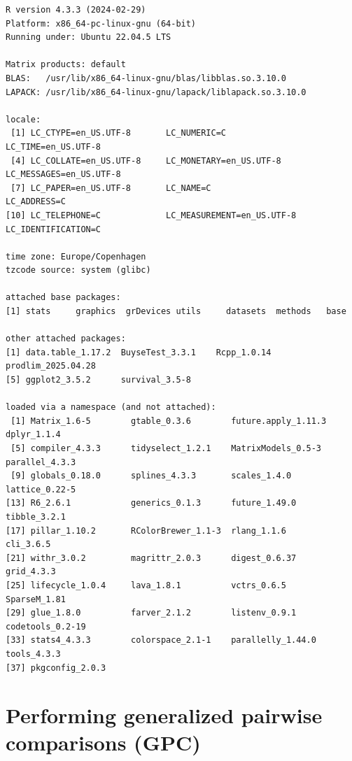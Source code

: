 \documentclass[12pt]{article}
\begin{document}
\begin{verbatim}
R version 4.3.3 (2024-02-29)
Platform: x86_64-pc-linux-gnu (64-bit)
Running under: Ubuntu 22.04.5 LTS

Matrix products: default
BLAS:   /usr/lib/x86_64-linux-gnu/blas/libblas.so.3.10.0 
LAPACK: /usr/lib/x86_64-linux-gnu/lapack/liblapack.so.3.10.0

locale:
 [1] LC_CTYPE=en_US.UTF-8       LC_NUMERIC=C               LC_TIME=en_US.UTF-8       
 [4] LC_COLLATE=en_US.UTF-8     LC_MONETARY=en_US.UTF-8    LC_MESSAGES=en_US.UTF-8   
 [7] LC_PAPER=en_US.UTF-8       LC_NAME=C                  LC_ADDRESS=C              
[10] LC_TELEPHONE=C             LC_MEASUREMENT=en_US.UTF-8 LC_IDENTIFICATION=C       

time zone: Europe/Copenhagen
tzcode source: system (glibc)

attached base packages:
[1] stats     graphics  grDevices utils     datasets  methods   base     

other attached packages:
[1] data.table_1.17.2  BuyseTest_3.3.1    Rcpp_1.0.14        prodlim_2025.04.28
[5] ggplot2_3.5.2      survival_3.5-8    

loaded via a namespace (and not attached):
 [1] Matrix_1.6-5        gtable_0.3.6        future.apply_1.11.3 dplyr_1.1.4        
 [5] compiler_4.3.3      tidyselect_1.2.1    MatrixModels_0.5-3  parallel_4.3.3     
 [9] globals_0.18.0      splines_4.3.3       scales_1.4.0        lattice_0.22-5     
[13] R6_2.6.1            generics_0.1.3      future_1.49.0       tibble_3.2.1       
[17] pillar_1.10.2       RColorBrewer_1.1-3  rlang_1.1.6         cli_3.6.5          
[21] withr_3.0.2         magrittr_2.0.3      digest_0.6.37       grid_4.3.3         
[25] lifecycle_1.0.4     lava_1.8.1          vctrs_0.6.5         SparseM_1.81       
[29] glue_1.8.0          farver_2.1.2        listenv_0.9.1       codetools_0.2-19   
[33] stats4_4.3.3        colorspace_2.1-1    parallelly_1.44.0   tools_4.3.3        
[37] pkgconfig_2.0.3
\end{verbatim}

\clearpage

\section{Performing generalized pairwise comparisons (GPC)}
\label{sec:org4706972}
\end{document}
